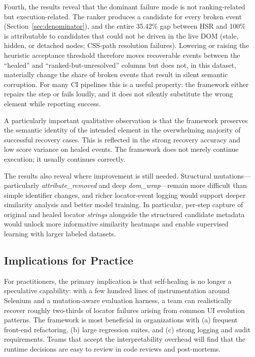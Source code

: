 \documentclass[conference]{IEEEtran}
\begin{document}
Fourth, the results reveal that the dominant failure mode is not ranking-related but execution-related. The ranker produces a candidate for every broken event (Section~\ref{sec:denominator}), and the entire 35.42\% gap between HSR and 100\% is attributable to candidates that could not be driven in the live DOM (stale, hidden, or detached nodes; CSS-path resolution failures). Lowering or raising the heuristic acceptance threshold therefore moves recoverable events between the ``healed'' and ``ranked-but-unresolved'' columns but does not, in this dataset, materially change the share of broken events that result in silent semantic corruption. For many CI pipelines this is a useful property: the framework either repairs the step or fails loudly, and it does not silently substitute the wrong element while reporting success.

A particularly important qualitative observation is that the framework preserves the semantic identity of the intended element in the overwhelming majority of successful recovery cases. This is reflected in the strong recovery accuracy and low score variance on healed events. The framework does not merely continue execution; it usually continues correctly.

The results also reveal where improvement is still needed. Structural mutations---particularly \emph{attribute\_removed} and deep \emph{dom\_wrap}---remain more difficult than simple identifier changes, and richer locator-event logging would support deeper similarity analysis and better model training. In particular, per-step capture of original and healed locator \emph{strings} alongside the structured candidate metadata would unlock more informative similarity heatmaps and enable supervised learning with larger labeled datasets.

\subsection{Implications for Practice}
For practitioners, the primary implication is that self-healing is no longer a speculative capability: with a few hundred lines of instrumentation around Selenium and a mutation-aware evaluation harness, a team can realistically recover roughly two-thirds of locator failures arising from common UI evolution patterns. The framework is most beneficial in organizations with (a) frequent front-end refactoring, (b) large regression suites, and (c) strong logging and audit requirements. Teams that accept the interpretability overhead will find that the runtime decisions are easy to review in code reviews and post-mortems.
\end{document}
